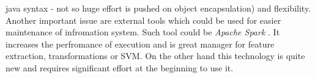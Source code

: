 java syntax - not so huge effort is pushed on object encapsulation) and flexibility. Another important issue are external tools which could be used for easier maintenance of infromation system. Such tool could be \textit{Apache Spark} \cite{28}. It increases the perfromance of execution and is great manager for feature extraction, transformations or SVM. On the other hand this technology is quite new and requires significant effort at the beginning to use it.     